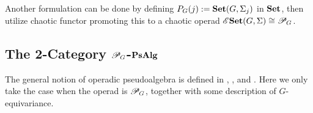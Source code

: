 \documentclass{article}
\begin{document}
Another formulation can be done by defining $P_G(j):= \mathbf{Set}(G,\Sigma_j)$ in $\mathbf{Set}$, then utilize chaotic functor promoting this to a chaotic operad $\mathscr{E}\mathbf{Set}(G,\Sigma)\cong \mathscr{P}_G$.

\subsection{The 2-Category $\mathscr{P}_G$-$\mathbf{PsAlg}$}\label{sub_P_G_psalg}

The general notion of operadic pseudoalgebra is defined in \cite{CG14}, \cite{GMMO20}, and \cite{LMRZ26}. Here we only take the case when the operad is $\mathscr{P}_G$, together with some description of $G$-equivariance.
\end{document}
